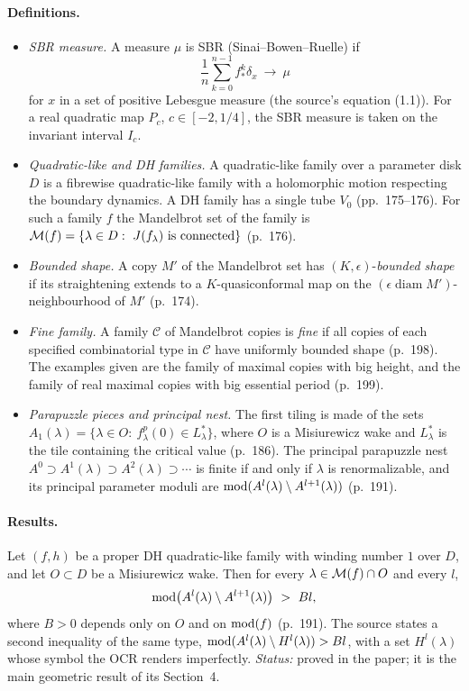 \paragraph{Definitions.}
\begin{itemize}
\item \emph{SBR measure.}  A measure $\mu$ is SBR (Sinai--Bowen--Ruelle) if
\[
\frac1n\sum_{k=0}^{n-1}f^k_*\delta_x\ \longrightarrow\ \mu
\]
for $x$ in a set of positive Lebesgue measure (the source's equation (1.1)).  For a real quadratic map $P_c$, $c\in[-2,1/4]$,
the SBR measure is taken on the invariant interval $I_c$.
\item \emph{Quadratic-like and DH families.}  A quadratic-like family over a parameter disk $D$ is a fibrewise
quadratic-like family with a holomorphic motion respecting the boundary dynamics.  A DH family has a single tube $V_0$
(pp.~175--176).  For such a family $f$ the
Mandelbrot set of the family is $\mathcal M(f)=\{\lambda\in D:\ J(f_\lambda)\text{ is connected}\}$ (p.~176).
\item \emph{Bounded shape.}  A copy $M'$ of the Mandelbrot set has $(K,\epsilon)$-\emph{bounded shape} if its straightening
extends to a $K$-quasiconformal map on the $(\epsilon\operatorname{diam}M')$-neighbourhood of $M'$ (p.~174).
\item \emph{Fine family.}  A family $\mathcal C$ of Mandelbrot copies is \emph{fine} if all copies of each specified
combinatorial type in $\mathcal C$ have uniformly bounded shape (p.~198).  The examples given are the family of
maximal copies with big height, and the family of real maximal copies with big essential period (p.~199).
\item \emph{Parapuzzle pieces and principal nest.}  The first tiling is made of the sets
$A_1(\lambda)=\{\lambda\in O:\ f^p_\lambda(0)\in L^*_\lambda\}$, where $O$ is a Misiurewicz wake and $L^*_\lambda$ is the tile
containing the critical value (p.~186).  The principal parapuzzle nest $A^0\supset A^1(\lambda)\supset A^2(\lambda)\supset\cdots$
is finite if and only if $\lambda$ is renormalizable, and its principal parameter moduli are
$\operatorname{mod}(A^l(\lambda)\setminus A^{l+1}(\lambda))$ (p.~191).
\end{itemize}

\paragraph{Results.}

\begin{theorem}
\label{thm:ast-A}
Let $(f,h)$ be a proper DH quadratic-like family with winding number $1$ over $D$, and let $O\subset D$ be a Misiurewicz
wake.  Then for every $\lambda\in\mathcal M(f)\cap O$ and every $l$,
\[
\operatorname{mod}\bigl(A^l(\lambda)\setminus A^{l+1}(\lambda)\bigr)\ >\ Bl,
\]
where $B>0$ depends only on $O$ and on $\operatorname{mod}(f)$ (p.~191).  The source states a second
inequality of the same type, $\operatorname{mod}(A^l(\lambda)\setminus H^l(\lambda))>Bl$, with a set $H^l(\lambda)$ whose symbol the OCR
renders imperfectly.  \emph{Status:} proved in the paper; it is the main geometric result of its Section~4.
\end{theorem}

